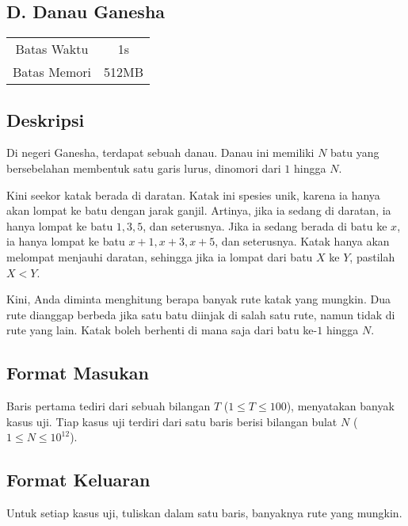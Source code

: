 \documentclass{article}
\begin{document}
\begin{center}
    \section*{D. Danau Ganesha}

    \begin{tabular}{ | c c | }
        \hline
        Batas Waktu  & 1s \\
        Batas Memori & 512MB \\
        \hline
    \end{tabular}
\end{center}

\subsection*{Deskripsi}

Di negeri Ganesha, terdapat sebuah danau.
Danau ini memiliki $N$ batu yang bersebelahan membentuk satu garis lurus, dinomori dari $1$ hingga $N$.

Kini seekor katak berada di daratan.
Katak ini spesies unik, karena ia hanya akan lompat ke batu dengan jarak ganjil.
Artinya, jika ia sedang di daratan, ia hanya lompat ke batu $1, 3, 5$, dan seterusnya.
Jika ia sedang berada di batu ke $x$, ia hanya lompat ke batu $x+1, x+3, x+5$, dan seterusnya.
Katak hanya akan melompat menjauhi daratan, sehingga jika ia lompat dari batu $X$ ke $Y$, pastilah $X < Y$.

Kini, Anda diminta menghitung berapa banyak rute katak yang mungkin. Dua rute dianggap berbeda jika satu batu diinjak di salah satu rute, namun tidak di rute yang lain. Katak boleh berhenti di mana saja dari batu ke-$1$ hingga $N$.

\subsection*{Format Masukan}

Baris pertama tediri dari sebuah bilangan $T$ ($1 \leq T \leq 100$), menyatakan banyak kasus uji.
Tiap kasus uji terdiri dari satu baris berisi bilangan bulat $N$ ($1 \leq N \leq 10^{12}$).

\subsection*{Format Keluaran}

Untuk setiap kasus uji, tuliskan dalam satu baris, banyaknya rute yang mungkin.
\end{document}
